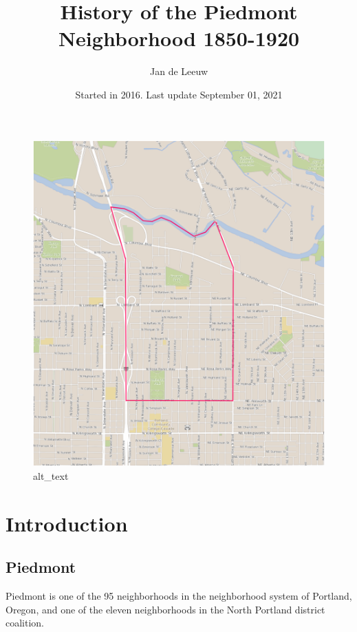 \documentclass[
  12pt,
]{book}
\title{History of the Piedmont Neighborhood 1850-1920}
\author{Jan de Leeuw}
\date{Started in 2016. Last update September 01, 2021}
\begin{document}
\maketitle

{
\setcounter{tocdepth}{4}
\tableofcontents
}
\begin{figure}
\centering
\includegraphics{images/00_images/image1.png}
\caption{alt\_text}
\end{figure}

\hypertarget{introduction}{%
\chapter*{Introduction}\label{introduction}}

\hypertarget{piedmont}{%
\section*{Piedmont}\label{piedmont}}

Piedmont is one of the 95 neighborhoods in the neighborhood system of Portland, Oregon, and one of the eleven neighborhoods in the North Portland district coalition.
\end{document}
